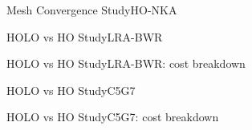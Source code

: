 \documentclass[sans,mathserif,aspectratio=169]{beamer}
\begin{document}
\begin{frame}{Mesh Convergence Study}{HO-NKA}
\centering
{}
\end{frame}

\begin{frame}{HOLO vs HO Study}{LRA-BWR}
\centering
{}
\end{frame}

\begin{frame}{HOLO vs HO Study}{LRA-BWR: cost breakdown}
\centering
{}
\end{frame}

\begin{frame}{HOLO vs HO Study}{C5G7}
\centering
{}
\end{frame}

\begin{frame}{HOLO vs HO Study}{C5G7: cost breakdown}
\centering
{}
\end{frame}
\end{document}
